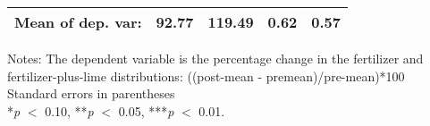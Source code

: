 \begin{table}[htbp]
\begin{threeparttable}
\begin{tabular}{l cccc}
Mean of dep. var:   &       92.77   &      119.49   &        0.62   &        0.57   \\
\hline
\hline
\end{tabular}
\begin{tablenotes}
\footnotesize
\item{Notes: The dependent variable is the percentage change in the fertilizer and fertilizer-plus-lime distributions: ((post-mean - premean)/pre-mean)*100 \\ Standard errors in parentheses \\ *\textit{p} $<$ 0.10, **\textit{p} $<$ 0.05, ***\textit{p} $<$ 0.01.}
\end{tablenotes}
\end{threeparttable}
\end{table}
